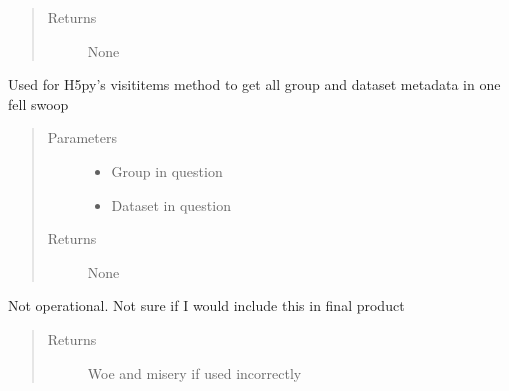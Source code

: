 \documentclass[letterpaper,10pt,english]{sphinxmanual}
\begin{document}
\begin{fulllineitems}
\begin{fulllineitems}
\begin{quote}
\begin{description}
\item[{Returns}] \leavevmode
\sphinxAtStartPar
None

\end{description}\end{quote}

\end{fulllineitems}


\begin{fulllineitems}
\label{\detokenize{index:HDF5Browser.FileBrowser.__print_attrs}}
\sphinxAtStartPar
Used for H5py’s visititems method to get all group and dataset metadata in one fell swoop
\begin{quote}\begin{description}
\item[{Parameters}] \leavevmode\begin{itemize}
\item {} 
\sphinxAtStartPar
{} \textendash{} Group in question

\item {} 
\sphinxAtStartPar
{} \textendash{} Dataset in question

\end{itemize}

\item[{Returns}] \leavevmode
\sphinxAtStartPar
None

\end{description}\end{quote}

\end{fulllineitems}


\begin{fulllineitems}
\label{\detokenize{index:HDF5Browser.FileBrowser.__rmFile}}
\sphinxAtStartPar
Not operational. Not sure if I would include this in final product
\begin{quote}\begin{description}
\item[{Returns}] \leavevmode
\sphinxAtStartPar
Woe and misery if used incorrectly


\end{description}
\end{quote}
\end{fulllineitems}
\end{fulllineitems}
\end{document}
